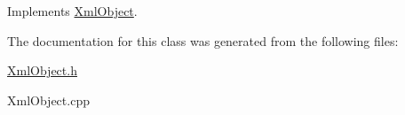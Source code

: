 Implements \hyperlink{classXmlObject_a23b560b6ef62e13cbe227824df5365c3}{Xml\-Object}.



The documentation for this class was generated from the following files\-:\begin{DoxyCompactItemize}
\item 
\hyperlink{XmlObject_8h}{Xml\-Object.\-h}\item 
Xml\-Object.\-cpp\end{DoxyCompactItemize}
